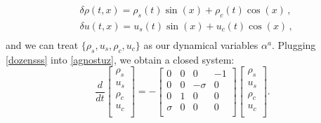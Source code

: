 \documentclass[a4paper, amsfonts, amssymb, amsmath, reprint, showkeys, nofootinbib, twoside, onecolumn,notitlepage]{revtex4-1}
\begin{document}
\begin{equation}\label{dozensss}
\begin{split}
& \delta \rho(t,x) = \rho_s(t) \sin(x)+ \rho_c(t) \cos(x) \, ,\\
& \delta u(t,x) = u_s(t)\sin(x) +u_c(t) \cos(x) \, , \\
\end{split}
\end{equation}
and we can treat $\{\rho_s,u_s,\rho_c,u_c\}$ as our dynamical variables $\alpha^a$. Plugging \eqref{dozensss} into \eqref{agnostuz}, we obtain a closed system:
\begin{equation}\label{quebueq}
\dfrac{d}{dt}
\begin{bmatrix}
\rho_s \\
u_s \\
\rho_c \\
u_c \\
\end{bmatrix} =- 
\begin{bmatrix}
0 & 0 & 0 & -1 \\
0 & 0 & -\sigma & 0 \\
0 & 1 & 0 & 0 \\
\sigma & 0 & 0 & 0 \\
\end{bmatrix} 
\begin{bmatrix}
\rho_s \\
u_s \\
\rho_c \\
u_c \\
\end{bmatrix} . 
\end{equation}
\end{document}

